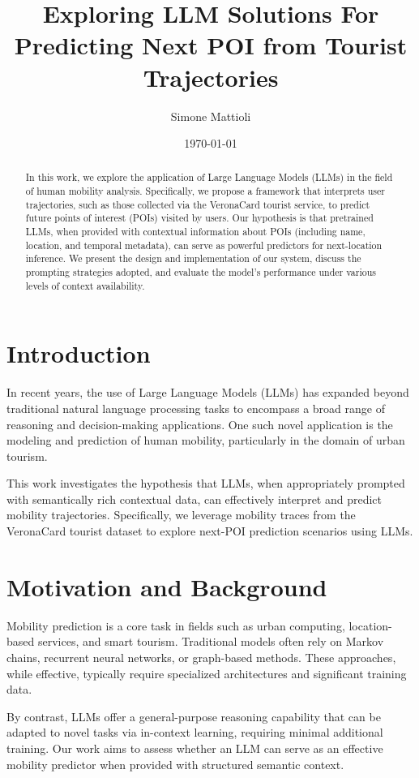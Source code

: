 \documentclass[a4paper,12pt]{article}
\title{Exploring LLM Solutions For Predicting Next POI from Tourist Trajectories
}
\author{Simone Mattioli}
\date{\today}
\begin{document}
\maketitle

\begin{abstract}
In this work, we explore the application of Large Language Models (LLMs) in the field of human mobility analysis. Specifically, we propose a framework that interprets user trajectories, such as those collected via the VeronaCard tourist service, to predict future points of interest (POIs) visited by users. Our hypothesis is that pretrained LLMs, when provided with contextual information about POIs (including name, location, and temporal metadata), can serve as powerful predictors for next-location inference. We present the design and implementation of our system, discuss the prompting strategies adopted, and evaluate the model's performance under various levels of context availability.
\end{abstract}

\section{Introduction}

In recent years, the use of Large Language Models (LLMs) has expanded beyond traditional natural language processing tasks to encompass a broad range of reasoning and decision-making applications. One such novel application is the modeling and prediction of human mobility, particularly in the domain of urban tourism.

This work investigates the hypothesis that LLMs, when appropriately prompted with semantically rich contextual data, can effectively interpret and predict mobility trajectories. Specifically, we leverage mobility traces from the VeronaCard tourist dataset to explore next-POI prediction scenarios using LLMs.

\section{Motivation and Background}

Mobility prediction is a core task in fields such as urban computing, location-based services, and smart tourism. Traditional models often rely on Markov chains, recurrent neural networks, or graph-based methods. These approaches, while effective, typically require specialized architectures and significant training data.

By contrast, LLMs offer a general-purpose reasoning capability that can be adapted to novel tasks via in-context learning, requiring minimal additional training. Our work aims to assess whether an LLM can serve as an effective mobility predictor when provided with structured semantic context.
\end{document}
